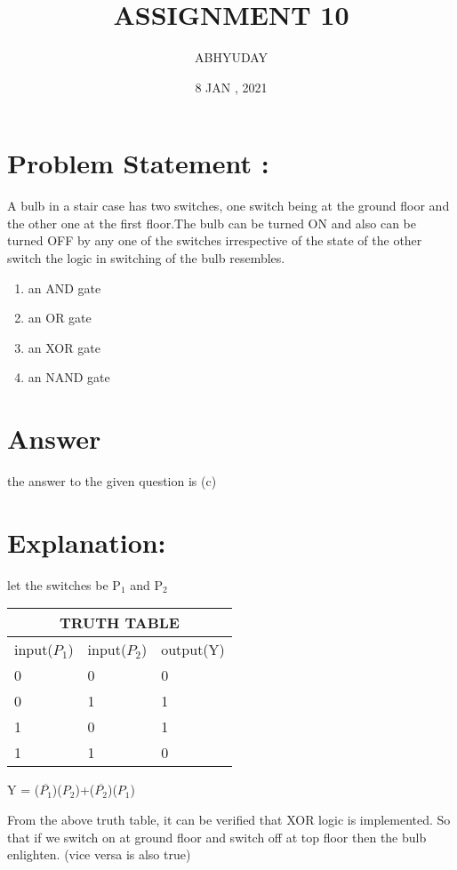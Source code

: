 \documentclass{article}
\title{ ASSIGNMENT 10}
\author{ABHYUDAY}
\date{8 JAN , 2021}
\begin{document}
\maketitle
\section{Problem Statement :}

A bulb in a stair case has two switches, one switch being at the ground floor and the other one at the first floor.The bulb can be turned ON and also can be turned OFF by any one of the switches irrespective of the state of the other switch the logic in switching of the bulb resembles.

\begin{enumerate}[label=(\Alph*)]
  \item an AND gate
\item an OR gate
\item an XOR gate
\item an NAND gate
\end{enumerate}



\maketitle
\newpage
\section{Answer}

the answer to the given question is (c)


\maketitle
\section{Explanation:}
let the switches be P$_1$ and P$_2$\newline


\setlength{\arrayrulewidth}{1mm}
\setlength{\tabcolsep}{18pt}
\renewcommand{\arraystretch}{1.5}



\begin{tabular}{ |p{1cm}|p{1cm}|p{1cm}| }
\hline
\multicolumn{3}{|c|}{ TRUTH TABLE } \\
\hline
input($P_1$) & input($P_2$) & output(Y) \\
\hline
  0 & 0 & 0 \\
\hline
0 & 1 & 1 \\
\hline
1 & 0 & 1 \\
\hline
1 & 1 & 0  \\
\hline

\end{tabular}

\vspace{1cm}

Y = ($\overline{P_1}$)($P_2$)+($\overline{P_2}$)($P_1$)
 
From the above truth table, it can be verified that XOR logic is implemented.
So that if we  switch on at ground floor and switch off at top floor then the bulb enlighten. (vice versa is also true)
\end{document}
